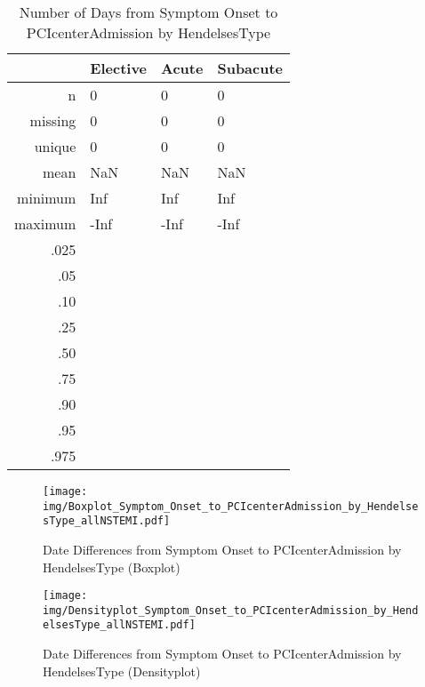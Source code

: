 \documentclass[a4paper]{report}
\begin{document}
\begin{itemize}
{%
\begin{table}[ht]
\centering
\begin{tabular}{rlll}
  \toprule
 & Elective & Acute & Subacute \\ 
  \midrule
n & 0 & 0 & 0 \\ 
  missing & 0 & 0 & 0 \\ 
  unique & 0 & 0 & 0 \\ 
  mean & NaN & NaN & NaN \\ 
  minimum & Inf & Inf & Inf \\ 
  maximum & -Inf & -Inf & -Inf \\ 
  .025 &  &  &  \\ 
  .05 &  &  &  \\ 
  .10 &  &  &  \\ 
  .25 &  &  &  \\ 
  .50 &  &  &  \\ 
  .75 &  &  &  \\ 
  .90 &  &  &  \\ 
  .95 &  &  &  \\ 
  .975 &  &  &  \\ 
   \bottomrule
\end{tabular}
\caption{Number of Days from Symptom Onset to PCIcenterAdmission by HendelsesType} 
\end{table}
\begin{figure}
  \centering
  \caption{Date Differences from Symptom Onset to PCIcenterAdmission by HendelsesType (Boxplot)}
  \label{Boxplot: Date Differences from Symptom Onset to PCIcenterAdmission by HendelsesType}
\texttt{[image: img/Boxplot\_Symptom\_Onset\_to\_PCIcenterAdmission\_by\_HendelsesType\_allNSTEMI.pdf]}\end{figure}


\begin{figure}
  \centering
  \caption{Date Differences from Symptom Onset to PCIcenterAdmission by HendelsesType (Densityplot)}
  \label{Density: Date Differences from Symptom Onset to PCIcenterAdmission by HendelsesType}
\texttt{[image: img/Densityplot\_Symptom\_Onset\_to\_PCIcenterAdmission\_by\_HendelsesType\_allNSTEMI.pdf]}\end{figure}


\clearpage

}
\end{itemize}
\end{document}
